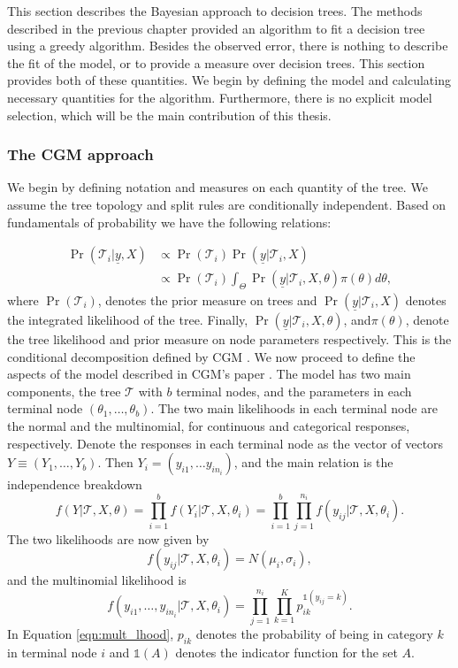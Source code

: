 \documentclass{article}
\newcommand{\yvec}{\underline{y}}
\begin{document}
This section describes the Bayesian approach to decision trees. The methods described in the previous chapter provided an algorithm to fit a decision tree using a greedy algorithm. Besides the observed error, there is nothing to describe the fit of the model, or to  provide a measure over decision trees. This section provides both of these quantities. We begin by defining the model and calculating necessary quantities for the algorithm. Furthermore, there is no explicit model selection, which will be the main contribution of this thesis.    

\subsubsection{The CGM approach}
We begin by defining notation and measures on each quantity of the tree. 
We assume the tree topology and split rules are conditionally independent. Based on fundamentals of probability we have the following relations:

\begin{align}
 \Pr(\mathcal{T}_i \vert \yvec, X ) &\propto \Pr(\mathcal{T}_i)\Pr(\yvec \vert \mathcal{T}_i, X)\\
  &\propto \Pr(\mathcal{T}_i)\int_{\Theta}\Pr(\yvec \vert \mathcal{T}_i, X, \theta)\pi(\theta)d\theta,
\end{align}
where $\Pr(\mathcal{T}_i)$, denotes the prior measure on trees and $\Pr(\yvec \vert \mathcal{T}_i, X)$ denotes the integrated likelihood of the tree. Finally, $\Pr(\yvec \vert \mathcal{T}_i, X, \theta)$, and$\pi(\theta)$, denote the tree likelihood and prior measure on node parameters respectively. This is the conditional decomposition defined by CGM \cite{chipman1998bayesian}. We now proceed to define the aspects of the model described in CGM's paper \cite{chipman1998bayesian}. 
The model has two main components, the tree $\mathcal{T}$ with $b$ terminal nodes, and the parameters in each terminal node $(\theta_1,\dots,\theta_b)$. 
The two main likelihoods in each terminal node are the normal and the multinomial, for continuous and categorical responses, respectively. 
Denote the responses in each terminal node as the vector  of vectors $Y\equiv (Y_1, \dots, Y_b)$. Then $Y_i = (y_{i1}, \dots y_{in_i})$, and the main relation is the independence breakdown 
\begin{equation}
f(Y\vert \mathcal{T}, X, \theta) =\prod_{i=1}^b f(Y_i\vert \mathcal{T}, X, \theta_i) = \prod_{i=1}^b \prod_{j=1}^{n_i} f(y_{ij} \vert \mathcal{T}, X, \theta_i).
\end{equation}
The two likelihoods are now given by
\begin{equation}
f(y_{ij} \vert \mathcal{T}, X, \theta_i) = N(\mu_i,\sigma_i),
\end{equation}
and the multinomial likelihood is
\begin{equation}\label{eqn:mult_lhood}
f(y_{i1}, \dots ,y_{in_i} \vert \mathcal{T}, X, \theta_i) = \prod_{j=1}^{n_i}\prod_{k=1}^K p_{ik}^{\mathds{1}(y_{ij}=k)}.
\end{equation}
In Equation \ref{eqn:mult_lhood}, $p_{ik}$ denotes the probability of being in category $k$ in terminal node $i$ and $\mathds{1}(A)$ denotes the indicator function for the set $A$. 
\end{document}
